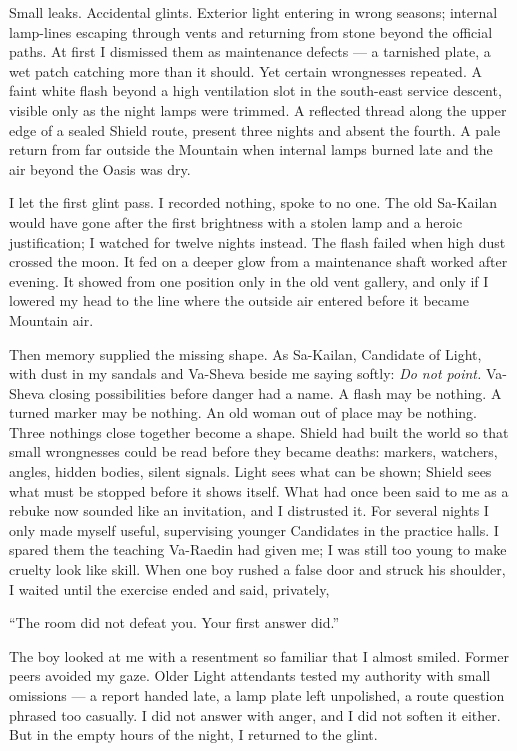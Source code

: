 Small leaks. Accidental glints. Exterior light entering in wrong seasons; internal lamp-lines escaping through vents and returning from stone beyond the official paths. At first I dismissed them as maintenance defects --- a tarnished plate, a wet patch catching more than it should. Yet certain wrongnesses repeated. A faint white flash beyond a high ventilation slot in the south-east service descent, visible only as the night lamps were trimmed. A reflected thread along the upper edge of a sealed Shield route, present three nights and absent the fourth. A pale return from far outside the Mountain when internal lamps burned late and the air beyond the Oasis was dry.\par

I let the first glint pass. I recorded nothing, spoke to no one. The old Sa-Kailan would have gone after the first brightness with a stolen lamp and a heroic justification; I watched for twelve nights instead. The flash failed when high dust crossed the moon. It fed on a deeper glow from a maintenance shaft worked after evening. It showed from one position only in the old vent gallery, and only if I lowered my head to the line where the outside air entered before it became Mountain air.\par

Then memory supplied the missing shape. As Sa-Kailan, Candidate of Light, with dust in my sandals and Va-Sheva beside me saying softly: \textit{Do not point.} Va-Sheva closing possibilities before danger had a name. A flash may be nothing. A turned marker may be nothing. An old woman out of place may be nothing. Three nothings close together become a shape. Shield had built the world so that small wrongnesses could be read before they became deaths: markers, watchers, angles, hidden bodies, silent signals. Light sees what can be shown; Shield sees what must be stopped before it shows itself. What had once been said to me as a rebuke now sounded like an invitation, and I distrusted it. For several nights I only made myself useful, supervising younger Candidates in the practice halls. I spared them the teaching Va-Raedin had given me; I was still too young to make cruelty look like skill. When one boy rushed a false door and struck his shoulder, I waited until the exercise ended and said, privately,\par

``The room did not defeat you. Your first answer did.''\par

The boy looked at me with a resentment so familiar that I almost smiled. Former peers avoided my gaze. Older Light attendants tested my authority with small omissions --- a report handed late, a lamp plate left unpolished, a route question phrased too casually. I did not answer with anger, and I did not soften it either. But in the empty hours of the night, I returned to the glint. \par

